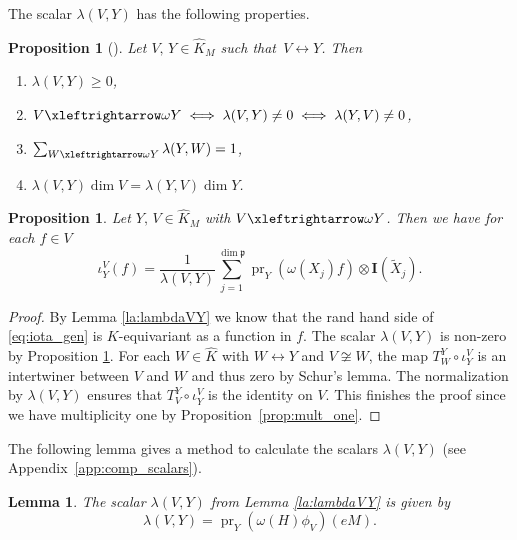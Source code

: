\documentclass[JEP,XML,SOM,NoFloatCountersInSection,Unicode,published]{cedram}
\newtheorem{proposition}[theorem]{Proposition}
\newtheorem{lemma}[theorem]{Lemma}
\theoremstyle{definition}
\newcommand{\lra}{\ensuremath{\leftrightarrow}}
\newcommand{\lraomega}{\ensuremath{\xleftrightarrow\omega}}
\newcommand{\mf}[1]{\ensuremath{\mathfrak{#1}}}
\newcommand{\on}[1]{\ensuremath{\operatorname{#1}}}
\newcommand{\I}{\ensuremath{\mathbf{I}}}
\begin{document}
The scalar $\lambda(V,Y)$ has the following properties.
\begin{proposition}[]\label{prop:lambdaVY_BO}
Let $V,\, Y\!\!\in\!\hat K_M$ such that~\hbox{$V\!\lra\!Y$}. Then
\begin{enumerate}
\item\label{it:lambdaVY_1} $\lambda(V,Y)\geq0$,
\item\label{it:lambdaVY_2} $V\lraomega Y\iff\lambda(V,Y)\neq0\iff\lambda(Y,V)\neq0$,
\item\label{it:lambdaVY_3} $\sum_{W\lraomega Y}\lambda(Y,W)=1$,
\item\label{it:lambdaVY_4} $\lambda(V,Y)\dim V=\lambda(Y,V)\dim Y$.
\end{enumerate}
\end{proposition}

\begin{proposition}\label{prop:iota_gen}
Let $Y,\, V\in\hat K_M$ with $V\lraomega Y$. Then we have for each $f\in V$\vspace*{-3pt}
\begin{equation}\label{eq:iota_gen}
\iota_Y^V(f)=\frac{1}{\lambda(V,Y)}\sum_{j=1}^{\dim\mf p}\on{pr}_Y(\omega(X_j)f)\otimes\I(\tilde X_j).
\end{equation}
\end{proposition}

\begin{proof}
By Lemma \ref{la:lambdaVY} we know that the rand hand side of \eqref{eq:iota_gen} is $K$-equivariant as a function in $f$. The scalar $\lambda(V,Y)$ is non-zero by Proposition \ref{prop:lambdaVY_BO}. For each $W\in\hat K$ with $W\lra Y$ and $V\not\cong W$, the map $T_W^Y\circ\iota_Y^V$ is an intertwiner between $V$ and $W$ and thus zero by Schur's lemma. The normalization by $\lambda(V,Y)$ ensures that $T_V^Y\circ\iota_Y^V$ is the identity on $V$. This finishes the proof since we have multiplicity one by Proposition~\ref{prop:mult_one}.
\end{proof}

The following lemma gives a method to calculate the scalars $\lambda(V,Y)$ (see Appendix~\ref{app:comp_scalars}).
\begin{lemma}\label{la:lambda_explicit}
The scalar $\lambda(V,Y)$ from Lemma \ref{la:lambdaVY} is given by\vspace*{-3pt}\enlargethispage{.5\baselineskip}
\[
\lambda(V,Y)=\on{pr}_Y(\omega(H)\phi_V)(eM).
\]
\end{lemma}
\end{document}
